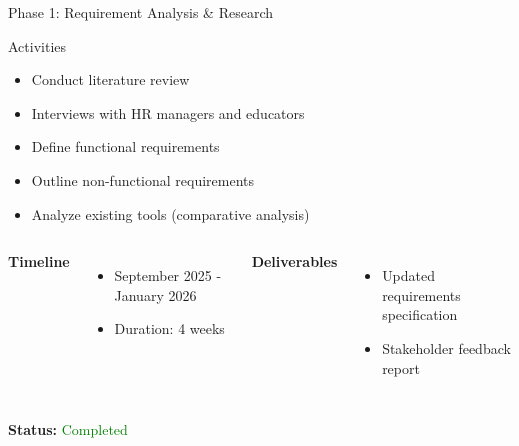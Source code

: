 \begin{frame}{Phase 1: Requirement Analysis \& Research}
    \begin{block}{Activities}
        \begin{itemize}
            \item Conduct literature review
            \item Interviews with HR managers and educators
            \item Define functional requirements
            \item Outline non-functional requirements
            \item Analyze existing tools (comparative analysis)
        \end{itemize}
    \end{block}
    
    \begin{columns}
        \textbf{Timeline}
        \begin{itemize}
            \item September 2025 - January 2026
            \item Duration: 4 weeks
        \end{itemize}
        
        \textbf{Deliverables}
        \begin{itemize}
            \item Updated requirements specification
            \item Stakeholder feedback report
        \end{itemize}
    \end{columns}
    
    \vspace{0.3cm}
    \begin{center}
        \textbf{Status:} \textcolor{green}{Completed}
    \end{center}
\end{frame}


